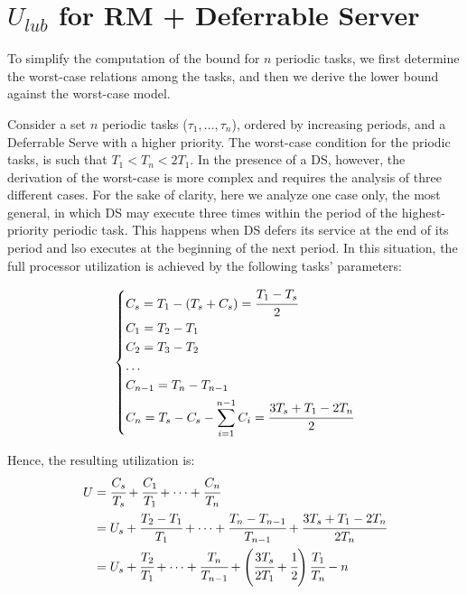 \chapter{$U_{lub}$ for RM + Deferrable Server}
To simplify the computation of the bound for $n$ periodic tasks, we first determine the worst-case relations among the tasks, and then we derive the lower bound against the worst-case model.

Consider a set $n$ periodic tasks ($\tau_1,\dots, \tau_n$), ordered by increasing periods, and a Deferrable Serve with a higher priority. The worst-case condition for the priodic tasks, is such that $T_1 < T_n < 2T_1$. In the presence of a DS, however, the derivation of the worst-case is more complex and requires the analysis of three different cases. For the sake of clarity, here we analyze one case only, the most general, in which DS may execute three times within the period of the highest-priority periodic task. This happens when DS defers its service at the end of its period and lso executes at the beginning of the next period. In this situation, the full processor utilization is achieved by the following tasks' parameters:

\[
\begin{dcases}
    C_s = T_1 - (T_s + C_s) = \cfrac{T_1 - T_s}{2}\\
    C_1 = T_2 - T_1\\
    C_2 = T_3 - T_2\\
    \dots\\
    C_{n-1} = T_n - T_{n-1}\\
    C_n = T_s - C_s - \sum_{i=1}^{n-1}C_i = \cfrac{3T_s + T_1 - 2T_n}{2}
\end{dcases}    
\]

Hence, the resulting utilization is:
\begin{align*}
    U &= \cfrac{C_s}{T_s} + \cfrac{C_1}{T_1} + \dots + \cfrac{C_n}{T_n}\\
    &= U_s + \cfrac{T_2 - T_1}{T_1} + \dots + \cfrac{T_n - T_{n-1}}{T_{n-1}} + \cfrac{3T_s + T_1 - 2T_n}{2T_n}\\
    &= U_s + \cfrac{T_2}{T_1} + \dots + \cfrac{T_n}{T_{n-1}} + \left(\cfrac{3T_s}{2T_1} + \cfrac{1}{2}\right) \cfrac{T_1}{T_n} - n 
\end{align*}

